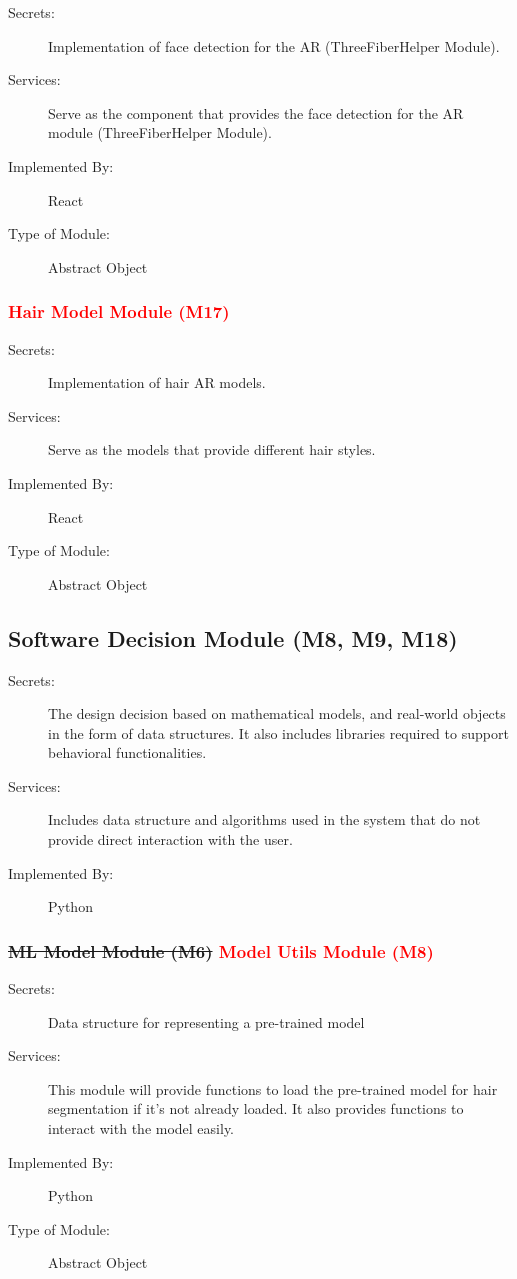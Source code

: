 \documentclass[12pt, titlepage]{article}
\begin{document}
\begin{description}
\item[Secrets:] Implementation of face detection for the AR (ThreeFiberHelper Module). 
\item[Services:] Serve as the component that provides the face detection for the AR module (ThreeFiberHelper Module).
\item[Implemented By:] React
\item[Type of Module:] Abstract Object
\end{description}

\subsubsection{\textcolor{red}{Hair Model Module (M17)}}

\begin{description}
\item[Secrets:] Implementation of hair AR models. 
\item[Services:] Serve as the models that provide different hair styles.
\item[Implemented By:] React
\item[Type of Module:] Abstract Object
\end{description}

\color{black}
\subsection{Software Decision Module (M8, M9, M18)}

\begin{description}
\item[Secrets:] The design decision based on mathematical models, and real-world objects in the form of data structures. It also includes libraries required to support behavioral functionalities.
\item[Services:] Includes data structure and algorithms used in the system that
  do not provide direct interaction with the user. 

\item[Implemented By:] Python
\end{description}

\subsubsection{\sout{ML Model Module (M6)} \textcolor{red}{Model Utils Module (M8)}}

\begin{description}
\item[Secrets:]Data structure for representing a pre-trained model
\item[Services:]  This module will provide functions to load the pre-trained model for hair segmentation if it's not already loaded. It also provides functions to interact with the model easily.
\item[Implemented By:] Python
\item[Type of Module:] Abstract Object
\end{description}
\end{document}
